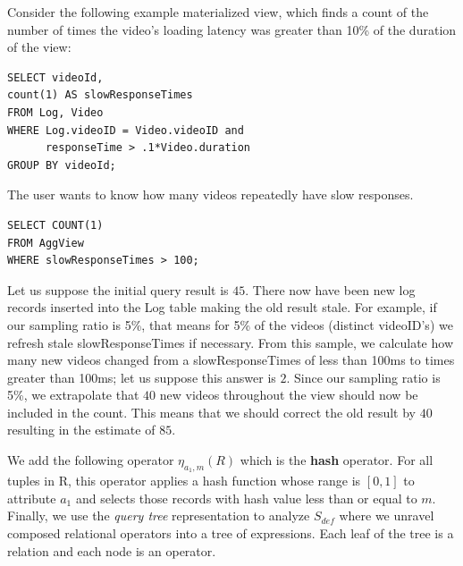 Consider the following example materialized view, which finds a count of the number of times the video's loading latency was greater than 10\% of the duration of the view:

\vspace{0.5em}

\begin{lstlisting} 
SELECT videoId, 
count(1) AS slowResponseTimes 
FROM Log, Video
WHERE Log.videoID = Video.videoID and
	  responseTime > .1*Video.duration
GROUP BY videoId;
\end{lstlisting}

The user wants to know how many videos repeatedly have slow responses.
\begin{lstlisting} 
SELECT COUNT(1)
FROM AggView
WHERE slowResponseTimes > 100;
\end{lstlisting}
Let us suppose the initial query result is $45$.
There now have been new log records inserted into the Log table making the old result stale.
For example, if our sampling ratio is 5\%, that means for 5\% of the videos (distinct videoID's) we refresh stale slowResponseTimes if necessary.
From this sample, we calculate how many new videos changed from a slowResponseTimes of less than 100ms to times greater than 100ms; let us suppose this answer is $2$.
Since our sampling ratio is 5\%, we extrapolate that $40$ new videos throughout the view should now be included in the count.
This means that we should correct the old result by $40$ resulting in the estimate of $85$.

\iffalse
We add the following operator $\eta_{a_1, m}(R)$ which is the \textbf{hash} operator.
For all tuples in R, this operator applies a hash function whose range is $[0,1]$ to attribute $a_1$ and selects those records with hash value less than or equal to $m$.
Finally, we use the \emph{query tree} representation to analyze $S_{def}$ where we unravel composed relational operators into a tree of expressions.
Each leaf of the tree is a relation and each node is an operator.

